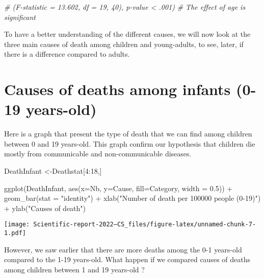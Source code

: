 \documentclass[
]{article}
\newenvironment{Shaded}{\begin{snugshade}}{\end{snugshade}}
\newcommand{\AttributeTok}[1]{\textcolor[rgb]{0.77,0.63,0.00}{#1}}
\newcommand{\CommentTok}[1]{\textcolor[rgb]{0.56,0.35,0.01}{\textit{#1}}}
\newcommand{\DecValTok}[1]{\textcolor[rgb]{0.00,0.00,0.81}{#1}}
\newcommand{\FloatTok}[1]{\textcolor[rgb]{0.00,0.00,0.81}{#1}}
\newcommand{\FunctionTok}[1]{\textcolor[rgb]{0.00,0.00,0.00}{#1}}
\newcommand{\NormalTok}[1]{#1}
\newcommand{\OtherTok}[1]{\textcolor[rgb]{0.56,0.35,0.01}{#1}}
\newcommand{\SpecialCharTok}[1]{\textcolor[rgb]{0.00,0.00,0.00}{#1}}
\newcommand{\StringTok}[1]{\textcolor[rgb]{0.31,0.60,0.02}{#1}}
\begin{document}
\begin{Shaded}
\begin{Highlighting}[]
\CommentTok{\# (F{-}statistic = 13.602, df = 19, 40), p{-}value \textless{} .001)}
\CommentTok{\# The effect of age is significant}
\end{Highlighting}
\end{Shaded}

To have a better understanding of the different causes, we will now look
at the three main causes of death among children and young-adults, to
see, later, if there is a difference compared to adults.

\hypertarget{causes-of-deaths-among-infants-0-19-years-old}{%
\section{Causes of deaths among infants (0-19
years-old)}\label{causes-of-deaths-among-infants-0-19-years-old}}

Here is a graph that present the type of death that we can find among
children between 0 and 19 years-old. This graph confirm our hypothesis
that children die mostly from communicable and non-communicable
diseases.

\begin{Shaded}
\begin{Highlighting}[]
\NormalTok{DeathInfant }\OtherTok{\textless{}{-}}\NormalTok{Deathstat[}\DecValTok{4}\SpecialCharTok{:}\DecValTok{18}\NormalTok{,]}

\FunctionTok{ggplot}\NormalTok{(DeathInfant, }\FunctionTok{aes}\NormalTok{(}\AttributeTok{x=}\NormalTok{Nb, }\AttributeTok{y=}\NormalTok{Cause, }\AttributeTok{fill=}\NormalTok{Category, }\AttributeTok{width =} \FloatTok{0.5}\NormalTok{)) }\SpecialCharTok{+}
  \FunctionTok{geom\_bar}\NormalTok{(}\AttributeTok{stat =} \StringTok{"identity"}\NormalTok{) }\SpecialCharTok{+}
  \FunctionTok{xlab}\NormalTok{(}\StringTok{"Number of death per 100\textquotesingle{}000 people (0{-}19)"}\NormalTok{) }\SpecialCharTok{+} 
  \FunctionTok{ylab}\NormalTok{(}\StringTok{"Causes of death"}\NormalTok{)}
\end{Highlighting}
\end{Shaded}

\texttt{[image: Scientific-report-2022---CS\_files/figure-latex/unnamed-chunk-7-1.pdf]}

However, we saw earlier that there are more deaths among the 0-1
years-old compared to the 1-19 years-old. What happen if we compared
causes of deaths among children between 1 and 19 years-old ?
\end{document}
